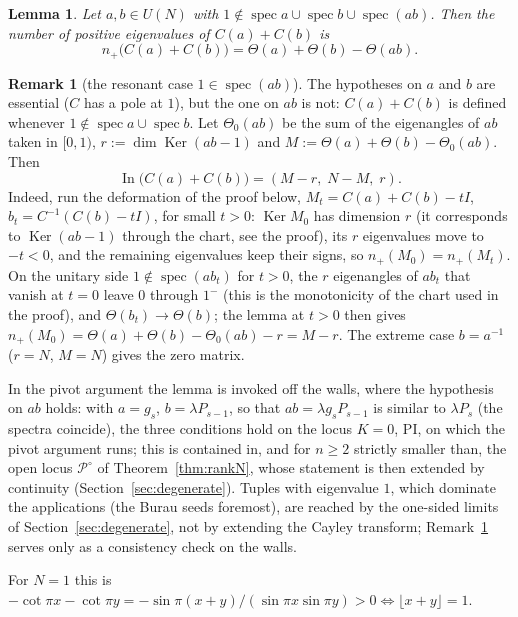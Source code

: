 \documentclass[11pt]{article}
\newtheorem{lemma}[theorem]{Lemma}
\theoremstyle{definition}
\newtheorem{remark}[theorem]{Remark}
\newcommand{\Ker}{\operatorname{Ker}}
\begin{document}
\begin{lemma}\label{lem:cayley}
Let $a,b\in U(N)$ with
$1\notin\operatorname{spec}a\cup\operatorname{spec}b
\cup\operatorname{spec}(ab)$. Then the number of positive eigenvalues of
$C(a)+C(b)$ is
\[
n_{+}\bigl(C(a)+C(b)\bigr)=\Theta(a)+\Theta(b)-\Theta(ab).
\]
\end{lemma}

\begin{remark}[the resonant case $1\in\operatorname{spec}(ab)$]
\label{rem:cayley-resonant}
The hypotheses on $a$ and $b$ are essential ($C$ has a pole at $1$),
but the one on $ab$ is not: $C(a)+C(b)$ is defined whenever
$1\notin\operatorname{spec}a\cup\operatorname{spec}b$. Let
$\Theta_0(ab)$ be the sum of the eigenangles of $ab$ taken in
$[0,1)$, $r:=\dim\Ker(ab-1)$ and
$M:=\Theta(a)+\Theta(b)-\Theta_0(ab)$. Then
\[
\operatorname{In}\bigl(C(a)+C(b)\bigr)=(M-r,\;N-M,\;r).
\]
Indeed, run the deformation of the proof below, $M_t=C(a)+C(b)-tI$,
$b_t=C^{-1}(C(b)-tI)$, for small $t>0$: $\Ker M_0$ has dimension $r$
(it corresponds to $\Ker(ab-1)$ through the chart, see the proof),
its $r$ eigenvalues move to $-t<0$, and the remaining eigenvalues keep
their signs, so $n_{+}(M_0)=n_{+}(M_t)$. On the unitary side
$1\notin\operatorname{spec}(ab_t)$ for $t>0$, the $r$ eigenangles of
$ab_t$ that vanish at $t=0$ leave $0$ through $1^{-}$ (this is the
monotonicity of the chart used in the proof), and
$\Theta(b_t)\to\Theta(b)$; the lemma at $t>0$ then gives
$n_{+}(M_0)=\Theta(a)+\Theta(b)-\Theta_0(ab)-r=M-r$. The extreme case
$b=a^{-1}$ ($r=N$, $M=N$) gives the zero matrix.
\end{remark}

In the pivot argument the lemma is invoked off the walls, where the
hypothesis on $ab$ holds: with $a=g_s$, $b=\lambda P_{s-1}$, so that
$ab=\lambda g_sP_{s-1}$ is similar to $\lambda P_s$ (the spectra
coincide), the three conditions hold on the locus $K=0$, PI, on which
the pivot argument runs; this is contained in, and for $n\ge2$
strictly smaller than, the open locus $\mathcal P^{\circ}$ of
Theorem~\ref{thm:rankN}, whose statement is then extended by
continuity (Section~\ref{sec:degenerate}). Tuples with eigenvalue $1$,
which dominate the applications (the Burau seeds foremost), are
reached by the one-sided limits of Section~\ref{sec:degenerate}, not
by extending the Cayley transform; Remark~\ref{rem:cayley-resonant}
serves only as a consistency check on the walls.

For $N=1$ this is
$-\cot\pi x-\cot\pi y=-\sin\pi(x+y)/(\sin\pi x\sin\pi y)>0
\iff\lfloor x+y\rfloor=1$.
\end{document}
